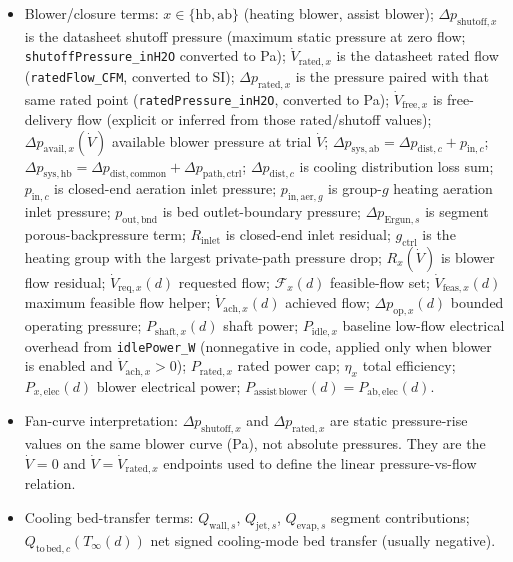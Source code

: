 \documentclass[11pt]{article}
\begin{document}
\begin{itemize}[leftmargin=*]
\item Blower/closure terms: \(x\in\{\mathrm{hb},\mathrm{ab}\}\) (heating blower, assist blower); \(\Delta p_{\mathrm{shutoff},x}\) is the datasheet shutoff pressure (maximum static pressure at zero flow; \texttt{shutoffPressure\_inH2O} converted to Pa); \(\dot V_{\mathrm{rated},x}\) is the datasheet rated flow (\texttt{ratedFlow\_CFM}, converted to SI); \(\Delta p_{\mathrm{rated},x}\) is the pressure paired with that same rated point (\texttt{ratedPressure\_inH2O}, converted to Pa); \(\dot V_{\mathrm{free},x}\) is free-delivery flow (explicit or inferred from those rated/shutoff values); \(\Delta p_{\mathrm{avail},x}(\dot V)\) available blower pressure at trial \(\dot V\); \(\Delta p_{\mathrm{sys},\mathrm{ab}}=\Delta p_{\mathrm{dist},c}+p_{\mathrm{in},c}\); \(\Delta p_{\mathrm{sys},\mathrm{hb}}=\Delta p_{\mathrm{dist,common}}+\Delta p_{\mathrm{path,ctrl}}\); \(\Delta p_{\mathrm{dist},c}\) is cooling distribution loss sum; \(p_{\mathrm{in},c}\) is closed-end aeration inlet pressure; \(p_{\mathrm{in,aer},g}\) is group-\(g\) heating aeration inlet pressure; \(p_{\mathrm{out,bnd}}\) is bed outlet-boundary pressure; \(\Delta p_{\mathrm{Ergun},s}\) is segment porous-backpressure term; \(R_{\mathrm{inlet}}\) is closed-end inlet residual; \(g_{\mathrm{ctrl}}\) is the heating group with the largest private-path pressure drop; \(R_x(\dot V)\) is blower flow residual; \(\dot V_{\mathrm{req},x}(d)\) requested flow; \(\mathcal{F}_x(d)\) feasible-flow set; \(\dot V_{\mathrm{feas},x}(d)\) maximum feasible flow helper; \(\dot V_{\mathrm{ach},x}(d)\) achieved flow; \(\Delta p_{\mathrm{op},x}(d)\) bounded operating pressure; \(P_{\mathrm{shaft},x}(d)\) shaft power; \(P_{\mathrm{idle},x}\) baseline low-flow electrical overhead from \texttt{idlePower\_W} (nonnegative in code, applied only when blower is enabled and \(\dot V_{\mathrm{ach},x}>0\)); \(P_{\mathrm{rated},x}\) rated power cap; \(\eta_x\) total efficiency; \(P_{x,\mathrm{elec}}(d)\) blower electrical power; \(P_{\mathrm{assist\,blower}}(d)=P_{\mathrm{ab},\mathrm{elec}}(d)\).
\item Fan-curve interpretation: \(\Delta p_{\mathrm{shutoff},x}\) and \(\Delta p_{\mathrm{rated},x}\) are static pressure-rise values on the same blower curve (Pa), not absolute pressures. They are the \(\dot V=0\) and \(\dot V=\dot V_{\mathrm{rated},x}\) endpoints used to define the linear pressure-vs-flow relation.
\item Cooling bed-transfer terms: \(Q_{\mathrm{wall},s}\), \(Q_{\mathrm{jet},s}\), \(Q_{\mathrm{evap},s}\) segment contributions; \(Q_{\mathrm{to\,bed},c}(T_\infty(d))\) net signed cooling-mode bed transfer (usually negative).
\end{itemize}
\end{document}
